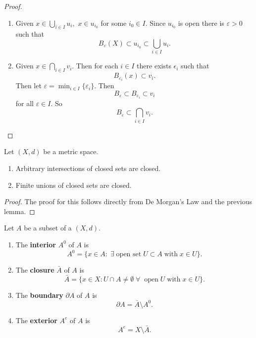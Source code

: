 \begin{proof}
    \begin{enumerate}
        \item Given
            $x \in \bigcup_{i \in I} u_i,$
            $x \in u_{i_0}$
            for some 
            $i_0 \in I.$
            Since $u_{i_0}$ is open there is $\varepsilon > 0$ such that
            \[ B_{\varepsilon}(X) \subset u_{i_0} \subset \bigcup_{i \in I} u_i. \]

        \item Given $x \in \bigcap_{i \in I} v_i$. Then for each $i \in I$ there exists $\epsilon_i$ such that
            \[ B_{\varepsilon_i}(x) \subset v_i. \]
            Then let $\varepsilon = \min_{i \in I} \{ \varepsilon_i \}$. Then
            \[ B_{\varepsilon} \subset B_{\varepsilon_i} \subset v_i \]
            for all $\varepsilon \in I$. So
            \[ B_{\varepsilon} \subset \bigcap_{i \in I} v_i. \]
    \end{enumerate}
\end{proof}

\begin{corollary}
    Let $(X, d)$ be a metric space. 
    \begin{enumerate}
        \item Arbitrary intersections of closed sets are closed.
        \item Finite unions of closed sets are closed.
    \end{enumerate}
\end{corollary}

\begin{proof}
    The proof for this follows directly from De Morgan's Law and the previous lemma.
\end{proof}

\begin{definition}
    Let $A$ be a subset of a $(X, d)$.
    \begin{enumerate}
        \item The \textbf{interior} $A^0$ of $A$ is
            \[ A^0 = \{ x \in A : \;\exists\; \text{open set} \; U \subset A \;\text{with}\; x \in U \}. \]
        \item The \textbf{closure} $\bar A$ of $A$ is
            \[ \bar A = \{ x \in X : U \cap A \neq \emptyset \;\forall\; \;\text{open}\; U \;\text{with}\; x \in U \}. \]
        \item The \textbf{boundary} $\partial A$ of $A$ is
            \[ \partial A = \bar A \setminus A^0. \]
        \item The \textbf{exterior} $A^e$ of $A$ is
            \[ A^e = X \setminus \bar A. \]
    \end{enumerate}
\end{definition}

